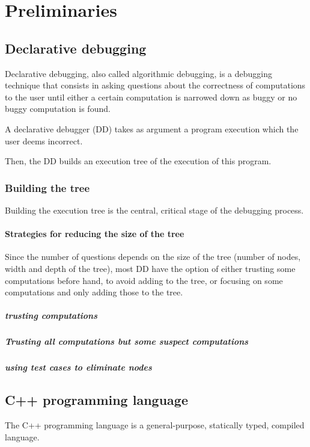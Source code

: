 \chapter{Preliminaries}
\label{cap:preliminares}

\section{Declarative debugging}
Declarative debugging, also called algorithmic debugging, is a debugging technique that consists in asking questions about the correctness of computations to the user until either a certain computation is narrowed down as buggy or no buggy computation is found.

A declarative debugger (DD) takes as argument a program execution which the user deems incorrect.

Then, the DD builds an execution tree of the execution of this program.

\subsection{Building the tree}

Building the execution tree is the central, critical stage of the debugging process.


\subsubsection{Strategies for reducing the size of the tree}

Since the number of questions depends on the size of the tree (number of nodes, width and depth of the tree), most DD have the option of either trusting some computations before hand, to avoid adding to the tree, or focusing on some computations and only adding those to the tree.
\paragraph{trusting computations}
\paragraph{Trusting all computations but some suspect computations}
\paragraph{using test cases to eliminate nodes}
\section{C++ programming language}
The C++ programming language is a general-purpose, statically typed, compiled language.

